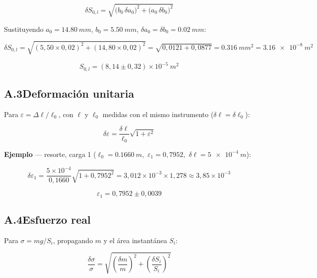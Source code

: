 \begin{appendices}
\begin{equation}
    \delta S_{0,l}
    = \sqrt{\bigl(b_0\,\delta a_0\bigr)^2 + \bigl(a_0\,\delta b_0\bigr)^2}
    \label{eq:inc_S0l}
\end{equation}

Sustituyendo $a_0 = \qty{14,80}{mm}$, $b_0 = \qty{5,50}{mm}$,
$\delta a_0 = \delta b_0 = \qty{0,02}{mm}$:

\[
    \delta S_{0,l}
    = \sqrt{(5{,}50 \times 0{,}02)^2 + (14{,}80 \times 0{,}02)^2}
    = \sqrt{0{,}0121 + 0{,}0877}
    = \qty{0,316}{mm^2}
    = \qty{3,16e-8}{m^2}
\]

\[
    \boxed{S_{0,l} = (8{,}14 \pm 0{,}32)\times10^{-5}\ \unit{m^2}}
\]

\subsection*{A.3\quad Deformación unitaria}

Para $\varepsilon = \Delta\ell/\ell_0$, con $\ell$ y $\ell_0$ medidas
con el mismo instrumento ($\delta\ell = \delta\ell_0$):

\begin{equation}
    \delta\varepsilon
    = \frac{\delta\ell}{\ell_0}\sqrt{1 + \varepsilon^2}
    \label{eq:inc_eps}
\end{equation}

\textbf{Ejemplo} — resorte, carga 1
($\ell_0 = \qty{0,1660}{m}$,\ $\varepsilon_1 = 0{,}7952$,\
$\delta\ell = \qty{5e-4}{m}$):

\[
    \delta\varepsilon_1
    = \frac{5\times10^{-4}}{0{,}1660}
      \sqrt{1 + 0{,}7952^2}
    = 3{,}012\times10^{-3} \times 1{,}278
    \approx 3{,}85\times10^{-3}
\]

\[
    \boxed{\varepsilon_1 = 0{,}7952 \pm 0{,}0039}
\]

\subsection*{A.4\quad Esfuerzo real}

Para $\sigma = mg/S_i$, propagando $m$ y el área instantánea $S_i$:

\begin{equation}
    \frac{\delta\sigma}{\sigma}
    = \sqrt{
        \left(\frac{\delta m}{m}\right)^{\!2}
        +
        \left(\frac{\delta S_i}{S_i}\right)^{\!2}
      }
    \label{eq:inc_sigma}
\end{equation}


\end{appendices}
